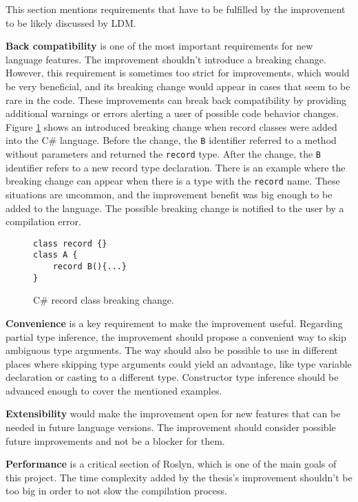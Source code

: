 This section mentions requirements that have to be fulfilled by the improvement to be likely discussed by \ac{LDM}.
\par
{}
\textbf{Back compatibility} is one of the most important requirements for new language features. 
The improvement shouldn’t introduce a breaking change. However, this requirement is sometimes too strict for improvements, which would be very beneficial, and its breaking change would appear in cases that seem to be rare in the code. 
These improvements can break back compatibility by providing additional warnings or errors alerting a user of possible code behavior changes.
Figure \ref{img39:brkCh} shows an introduced breaking change when record classes were added into the C\# language. 
Before the change, the \texttt{B} identifier referred to a method without parameters and returned the \texttt{record} type. 
After the change, the \texttt{B} identifier refers to a new record type declaration. 
There is an example where the breaking change can appear when there is a type with the \texttt{record} name. 
These situations are uncommon, and the improvement benefit was big enough to be added to the language. 
The possible breaking change is notified to the user by a compilation error.
\begin{figure}[h]
\begin{lstlisting}[style=csharp]
class record {}
class A {
    record B(){...}
}
\end{lstlisting}
\caption{C\# record class breaking change.}
\label{img39:brkCh}
\end{figure}
\par
{}
\textbf{Convenience} is a key requirement to make the improvement useful. 
Regarding partial type inference, the improvement should propose a convenient way to skip ambiguous type arguments. 
The way should also be possible to use in different places where skipping type arguments could yield an advantage, like type variable declaration or casting to a different type. 
Constructor type inference should be advanced enough to cover the mentioned examples.
\par
{}
\textbf{Extensibility} would make the improvement open for new features that can be needed in future language versions. 
The improvement should consider possible future improvements and not be a blocker for them.
\par
{}
\textbf{Performance} is a critical section of Roslyn, which is one of the main goals of this project.
The time complexity added by the thesis’s improvement shouldn’t be too big in order to not slow the compilation process.

